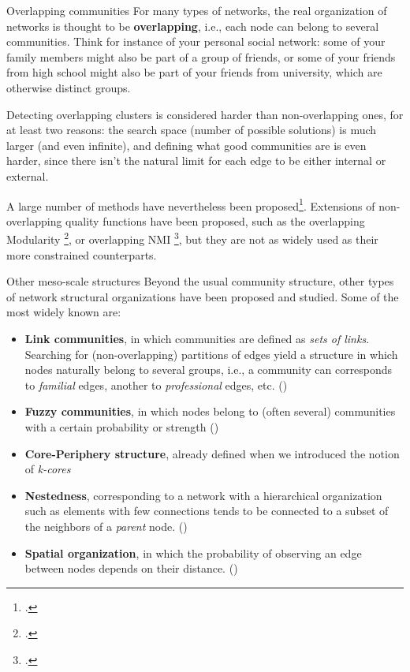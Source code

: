 \documentclass[a4paper,11pt]{book}
\begin{document}
\begin{textbox}{Overlapping communities}
For many types of networks, the real organization of networks is thought to be \textbf{overlapping}, i.e., each node can belong to several communities. Think for instance of your personal social network: some of your family members might also be part of a group of friends, or some of your friends from high school might also be part of your friends from university, which are otherwise distinct groups. 

Detecting overlapping clusters is considered harder than non-overlapping ones, for at least two reasons: the search space (number of possible solutions) is much larger (and even infinite), and defining what good communities are is even harder, since there isn't the natural limit for each edge to be either internal or external.

A large number of methods have nevertheless been proposed\footcite{xie2013overlapping}. Extensions of non-overlapping quality functions have been proposed, such as the overlapping Modularity \footcite{nicosia2009extending}, or overlapping NMI \footcite{mcdaid2011normalized}, but they are not as widely used as their more constrained counterparts.
\end{textbox}

\begin{textbox}{Other meso-scale structures}
Beyond the usual community structure, other types of network structural organizations have been proposed and studied. Some of the most widely known are:
\begin{itemize}
    \item \textbf{Link communities}, in which communities are defined as \textit{sets of links}. Searching for (non-overlapping) partitions of edges yield a structure in which nodes naturally belong to several groups, i.e., a community can corresponds to \textit{familial} edges, another to \textit{professional} edges, etc. (\cite{ahn2010link})
    \item \textbf{Fuzzy communities}, in which nodes belong to (often several) communities with a certain probability or strength (\cite{liu2010fuzzy})
    \item \textbf{Core-Periphery structure}, already defined when we introduced the notion of \textit{k-cores}
    \item \textbf{Nestedness}, corresponding to a network with a hierarchical organization such as elements with few connections tends to be connected to a subset of the neighbors of a \textit{parent} node. (\cite{pawar2014plant})
    \item \textbf{Spatial organization}, in which the probability of observing an edge between nodes depends on their distance. (\cite{barthelemy2011spatial})
\end{itemize}
\end{textbox}
\end{document}
